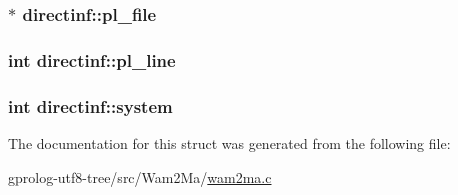 \subsubsection[{\texorpdfstring{pl\+\_\+file}{pl_file}}]{$\ast$ directinf\+::pl\+\_\+file}\hypertarget{structdirectinf_a2d00b2ef3ca0317b568b16ed20968e52}{}\label{structdirectinf_a2d00b2ef3ca0317b568b16ed20968e52}
\subsubsection[{\texorpdfstring{pl\+\_\+line}{pl_line}}]{\setlength{\rightskip}{0pt plus 5cm}int directinf\+::pl\+\_\+line}\hypertarget{structdirectinf_ae817c137ec2f80b2a6409ae0ca8faa7a}{}\label{structdirectinf_ae817c137ec2f80b2a6409ae0ca8faa7a}
\subsubsection[{\texorpdfstring{system}{system}}]{\setlength{\rightskip}{0pt plus 5cm}int directinf\+::system}\hypertarget{structdirectinf_a328d981a0d78b287ff7494df8d501635}{}\label{structdirectinf_a328d981a0d78b287ff7494df8d501635}


The documentation for this struct was generated from the following file\+:\begin{DoxyCompactItemize}
\item 
gprolog-\/utf8-\/tree/src/\+Wam2\+Ma/\hyperlink{wam2ma_8c}{wam2ma.\+c}\end{DoxyCompactItemize}

